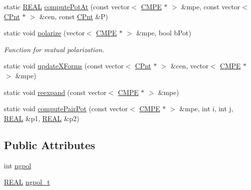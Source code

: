 \begin{DoxyCompactItemize}
\item 
static \hyperlink{util_8h_a5821460e95a0800cf9f24c38915cbbde}{R\-E\-A\-L} \hyperlink{classCMPE_a8a6b260459ff6af55260e2c7897f3bd0}{compute\-Pot\-At} (const vector$<$ \hyperlink{classCMPE}{C\-M\-P\-E} $\ast$ $>$ \&mpe, const vector$<$ \hyperlink{classCPnt}{C\-Pnt} $\ast$ $>$ \&cen, const \hyperlink{classCPnt}{C\-Pnt} \&P)
\item 
static void \hyperlink{classCMPE_ab6f4e1fc5fe634c04841e691903d8029}{polarize} (vector$<$ \hyperlink{classCMPE}{C\-M\-P\-E} $\ast$ $>$ \&mpe, bool b\-Pot)
\begin{DoxyCompactList}\small\item\em Function for mutual polarization. \end{DoxyCompactList}\item 
static void \hyperlink{classCMPE_a65d2f19a87b451dbd84bb4b11cbfd571}{update\-X\-Forms} (const vector$<$ \hyperlink{classCPnt}{C\-Pnt} $\ast$ $>$ \&cen, vector$<$ \hyperlink{classCMPE}{C\-M\-P\-E} $\ast$ $>$ \&mpe)
\item 
static void \hyperlink{classCMPE_af10ee159904becb5add924aa48df3c56}{reexpand} (const vector$<$ \hyperlink{classCMPE}{C\-M\-P\-E} $\ast$ $>$ \&mpe)
\item 
static void \hyperlink{classCMPE_ab494bf000a7dec9410d23a5f47204baf}{compute\-Pair\-Pot} (const vector$<$ \hyperlink{classCMPE}{C\-M\-P\-E} $\ast$ $>$ \&mpe, int i, int j, \hyperlink{util_8h_a5821460e95a0800cf9f24c38915cbbde}{R\-E\-A\-L} \&p1, \hyperlink{util_8h_a5821460e95a0800cf9f24c38915cbbde}{R\-E\-A\-L} \&p2)
\end{DoxyCompactItemize}
\subsection*{Public Attributes}
\begin{DoxyCompactItemize}
\item 
int \hyperlink{classCMPE_a17b9196644f13740f99675a5a0d8ef23}{ngpol}
\item 
\hyperlink{util_8h_a5821460e95a0800cf9f24c38915cbbde}{R\-E\-A\-L} \hyperlink{classCMPE_afc7b0e78e954f7bb1419864a70c4d0b7}{ngpol\-\_\-t}
\end{DoxyCompactItemize}

